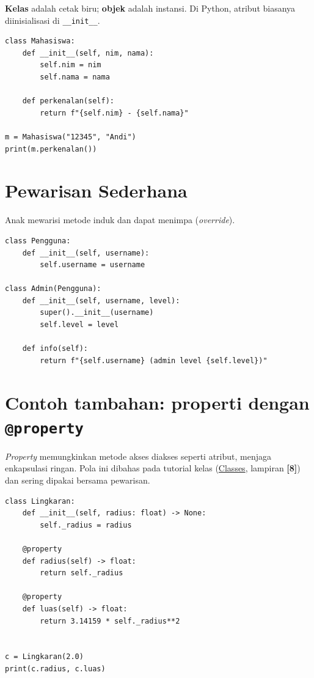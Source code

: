 \documentclass[../main.tex]{subfiles}
\begin{document}
\textbf{Kelas} adalah cetak biru; \textbf{objek} adalah instansi. Di Python, atribut biasanya diinisialisasi di \texttt{\_\_init\_\_}.

\begin{lstlisting}[caption=Kelas sederhana dengan metode]
class Mahasiswa:
    def __init__(self, nim, nama):
        self.nim = nim
        self.nama = nama

    def perkenalan(self):
        return f"{self.nim} - {self.nama}"

m = Mahasiswa("12345", "Andi")
print(m.perkenalan())
\end{lstlisting}

\section{Pewarisan Sederhana}

Anak mewarisi metode induk dan dapat menimpa (\textit{override}).

\begin{lstlisting}[caption=Pewarisan]
class Pengguna:
    def __init__(self, username):
        self.username = username

class Admin(Pengguna):
    def __init__(self, username, level):
        super().__init__(username)
        self.level = level

    def info(self):
        return f"{self.username} (admin level {self.level})"
\end{lstlisting}

\section{Contoh tambahan: properti dengan \texttt{@property}}

\noindent \textit{Property} memungkinkan metode akses diakses seperti atribut, menjaga enkapsulasi ringan. Pola ini dibahas pada tutorial kelas (\href{https://docs.python.org/3/tutorial/classes.html}{Classes}, lampiran \textbf{[8]}) dan sering dipakai bersama pewarisan.

\begin{lstlisting}[caption=Getter sederhana dengan property]
class Lingkaran:
    def __init__(self, radius: float) -> None:
        self._radius = radius

    @property
    def radius(self) -> float:
        return self._radius

    @property
    def luas(self) -> float:
        return 3.14159 * self._radius**2


c = Lingkaran(2.0)
print(c.radius, c.luas)
\end{lstlisting}
\end{document}
